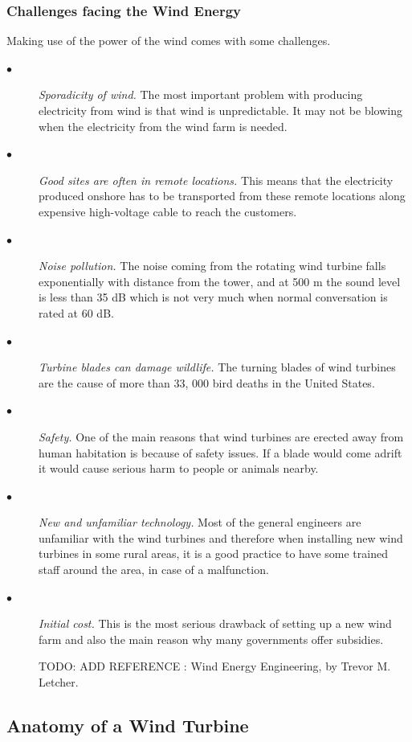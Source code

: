 \documentclass[twosided,a4,10pt]{article}
\begin{document}
\begin{multicols}{2}
 \subsubsection{Challenges facing the Wind Energy} Making use of the power of the wind comes with some challenges.
 \begin{description}
 	\item[$\bullet$]
 	\textit{Sporadicity of wind.} The most important problem with producing electricity from wind is that wind is unpredictable. It may not be blowing when the electricity from the wind farm is needed.  
 	\item[$\bullet$]
 	\textit{Good sites are often in remote locations.} This means that the electricity produced onshore has to be transported from these remote locations along expensive high-voltage cable to reach the customers.
 	\item[$\bullet$]
 	\textit{Noise pollution.} The noise coming from the rotating wind turbine falls exponentially with distance from the tower, and at 500 m the sound level is less than 35 dB which is not very much when normal conversation is rated at 60 dB.
 	\item[$\bullet$]
 	\textit{Turbine blades can damage wildlife.} The turning blades of wind turbines are the cause of more than 33, 000 bird deaths in the United States.
 	\item[$\bullet$]
 	\textit{Safety.} One of the main reasons that wind turbines are erected away from human habitation is because of safety issues. If a blade would come adrift it would cause serious harm to people or animals nearby.
 	\item[$\bullet$]
 	\textit{New and unfamiliar technology.} Most of the general engineers are unfamiliar with the wind turbines and therefore when installing new wind turbines in some rural areas, it is a good practice to have some trained staff around the area, in case of a malfunction.
 	\item[$\bullet$]
 	\textit{Initial cost.} This is the most serious drawback of setting up a new wind farm and also the main reason why many governments offer subsidies.
 	
 	TODO: ADD REFERENCE : Wind Energy Engineering, by Trevor M. Letcher.
 \end{description}

\subsection{Anatomy of a Wind Turbine}

\end{multicols}
\end{document}
